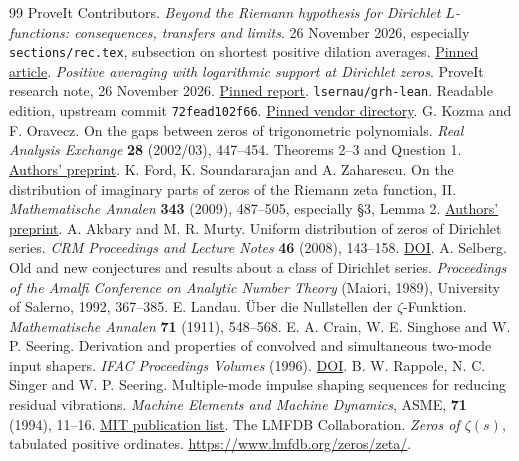 \documentclass[11pt,letterpaper]{article}
\theoremstyle{remark}\newtheorem{remark}[theorem]{Remark}
\newcommand{\baseurl}{https://github.com/VladimirReshetnikov/ProveIt}
\begin{document}
\begin{thebibliography}{99}
 ProveIt Contributors. \emph{Beyond the Riemann hypothesis
for Dirichlet $L$-functions: consequences, transfers and limits}. 26 November
2026, especially \texttt{sections/rec.tex}, subsection on shortest positive
dilation averages. \href{\baseurl/tree/b6253012cf30c80a989c871906e097a27f23a27c/Analysis/GeneralizedRiemannHypothesis/Article}{Pinned article}.
 \emph{Positive averaging with logarithmic support at Dirichlet
zeros}. ProveIt research note, 26 November 2026.
\href{\baseurl/tree/b6253012cf30c80a989c871906e097a27f23a27c/Analysis/GeneralizedRiemannHypothesis/Research/logarithmic_dirichlet_zero_filters_2026-11-26}{Pinned report}.
 \texttt{lsernau/grh-lean}. Readable edition, upstream
commit \texttt{72fead102f66}.
\href{\baseurl/tree/b6253012cf30c80a989c871906e097a27f23a27c/Analysis/GeneralizedRiemannHypothesis/vendor/grh-lean}{Pinned vendor directory}.
 G. Kozma and F. Oravecz. On the gaps between zeros of
trigonometric polynomials. \emph{Real Analysis Exchange} \textbf{28}
(2002/03), 447--454. Theorems 2--3 and Question 1.
\href{https://arxiv.org/abs/math/0601021}{Authors' preprint}.
 K. Ford, K. Soundararajan and A. Zaharescu.
On the distribution of imaginary parts of zeros of the Riemann zeta function, II.
\emph{Mathematische Annalen} \textbf{343} (2009), 487--505,
especially \S3, Lemma 2.
\href{https://arxiv.org/abs/0805.2745}{Authors' preprint}.
 A. Akbary and M. R. Murty. Uniform distribution of zeros of
Dirichlet series. \emph{CRM Proceedings and Lecture Notes} \textbf{46}
(2008), 143--158. \href{https://doi.org/10.1090/crmp/046/10}{DOI}.
 A. Selberg. Old and new conjectures and results about a class
of Dirichlet series. \emph{Proceedings of the Amalfi Conference on Analytic
Number Theory} (Maiori, 1989), University of Salerno, 1992, 367--385.
 E. Landau. \"Uber die Nullstellen der $\zeta$-Funktion.
\emph{Mathematische Annalen} \textbf{71} (1911), 548--568.
 E. A. Crain, W. E. Singhose and W. P. Seering. Derivation and properties
of convolved and simultaneous two-mode input shapers. \emph{IFAC Proceedings
Volumes} (1996). \href{https://doi.org/10.1016/S1474-6670(17)58856-4}{DOI}.
 B. W. Rappole, N. C. Singer and W. P. Seering.
Multiple-mode impulse shaping sequences for reducing residual vibrations.
\emph{Machine Elements and Machine Dynamics}, ASME, \textbf{71} (1994), 11--16.
\href{https://web.mit.edu/shaping/www/dates.html}{MIT publication list}.
 The LMFDB Collaboration. \emph{Zeros of $\zeta(s)$},
tabulated positive ordinates. \url{https://www.lmfdb.org/zeros/zeta/}.
\end{thebibliography}
\end{document}
